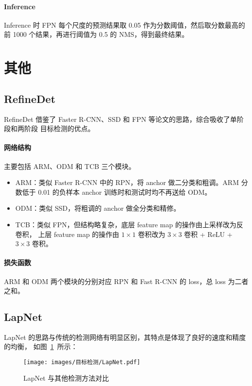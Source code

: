 \paragraph{Inference}
Inference 时 FPN 每个尺度的预测结果取 0.05 作为分数阈值，然后取分数最高的前 1000
个结果，再进行阈值为 0.5 的 NMS，得到最终结果。

\section{其他}

\subsection{RefineDet}
RefineDet 借鉴了 Faster R-CNN、SSD 和 FPN 等论文的思路，综合吸收了单阶段和两阶段
目标检测的优点。

\paragraph{网络结构}
主要包括 ARM、ODM 和 TCB 三个模块。
\begin{itemize}
  \item ARM：类似 Faster R-CNN 中的 RPN，将 anchor 做二分类和粗调。ARM 分数低于
    0.01 的负样本 anchor 训练时和测试时均不再送给 ODM。
  \item ODM：类似 SSD，将粗调的 anchor 做全分类和精修。
  \item TCB：类似 FPN，但结构略复杂，底层 feature map 的操作由上采样改为反卷积，
    上层 feature map 的操作由 $1 \times 1$ 卷积改为 $3 \times 3$ 卷积 + ReLU +
    $3 \times 3$ 卷积。
\end{itemize}

\paragraph{损失函数}
ARM 和 ODM 两个模块的分别对应 RPN 和 Fast R-CNN 的 loss，总 loss 为二者之和。

\subsection{LapNet}
LapNet 的思路与传统的检测网络有明显区别，其特点是体现了良好的速度和精度的均衡，
如图~\ref{fig:LapNet}~所示：

\begin{figure}[ht]
  \centering
  \texttt{[image: images/目标检测/LapNet.pdf]}
  \caption{LapNet 与其他检测方法对比}
  \label{fig:LapNet}
\end{figure}

